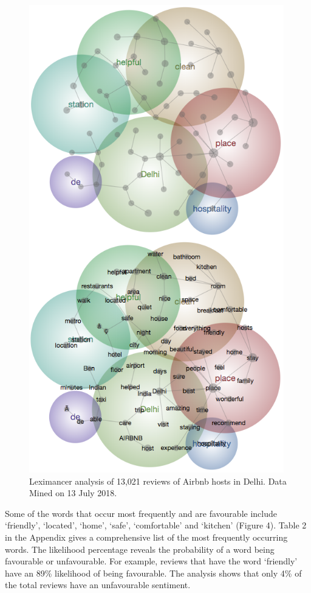 \documentclass[a4paper, 12pt]{article}
\begin{document}
\begin{figure}[h!]
\centering
\includegraphics[height=8in]{figure6.png} 
\caption{Leximancer analysis of 13,021 reviews of Airbnb hosts in Delhi. Data Mined on 13 July 2018.}
\end{figure}

Some of the words that occur most frequently and are favourable include ‘friendly’, ‘located’, ‘home’, ‘safe’, ‘comfortable’ and ‘kitchen’ (Figure 4). Table 2 in the Appendix gives a comprehensive list of the most frequently occurring words. The likelihood percentage reveals the probability of a word being favourable or unfavourable. For example, reviews that have the word ‘friendly’ have an 89\% likelihood of being favourable. The analysis shows that only 4\% of the total reviews have an unfavourable sentiment.\\
\end{document}
